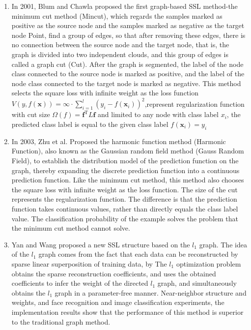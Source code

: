 \documentclass[11pt,en]{elegantpaper}
\begin{document}
\begin{enumerate}
	\item In 2001, Blum and Chawla proposed the first graph-based SSL method-the minimum cut method (Mincut), which regards the samples marked as positive as the source node and the samples marked as negative as the target node Point, find a group of edges, so that after removing these edges, there is no connection between the source node and the target node, that is, the graph is divided into two independent clouds, and this group of edges is called a graph cut (Cut). After the graph is segmented, the label of the node class connected to the source node is marked as positive, and the label of the node class connected to the target node is marked as negative. This method selects the square loss with infinite weight as the loss function $V(y, f(\boldsymbol{x}))=\infty \cdot \sum_{i=1}^{l}\left(y_{i}-f\left(\boldsymbol{x}_{i}\right)\right)^{2}$,represent regularization function with cut size $\Omega(f)=\boldsymbol{f}^{\mathrm{T}} L \boldsymbol{f}$ and limited to any node with class label $ x_ {i} $, the predicted class label is equal to the given class label $f\left(\boldsymbol{x}_{i}\right)=y_{i}$
	\item In 2003, Zhu et al. Proposed the harmonic function method (Harmonic Function), also known as the Gaussian random field method (Gauss Random Field), to establish the distribution model of the prediction function on the graph, thereby expanding the discrete prediction function into a continuous prediction function. Like the minimum cut method, this method also chooses the square loss with infinite weight as the loss function. The size of the cut represents the regularization function. The difference is that the prediction function takes continuous values, rather than directly equals the class label value. The classification probability of the example solves the problem that the minimum cut method cannot solve.
	\item Yan and Wang proposed a new SSL structure based on the $ l_ {1} $ graph. The idea of the $ l_ {1} $ graph comes from the fact that each data can be reconstructed by sparse linear superposition of training data, by The $ l_ {1} $ optimization problem obtains the sparse reconstruction coefficients, and uses the obtained coefficients to infer the weight of the directed $ l_ {1} $ graph, and simultaneously obtains the $ l_ {1} $ graph in a parameter-free manner. Near-neighbor structure and weights, and face recognition and image classification experiments, the implementation results show that the performance of this method is superior to the traditional graph method.
\end{enumerate}
\end{document}
